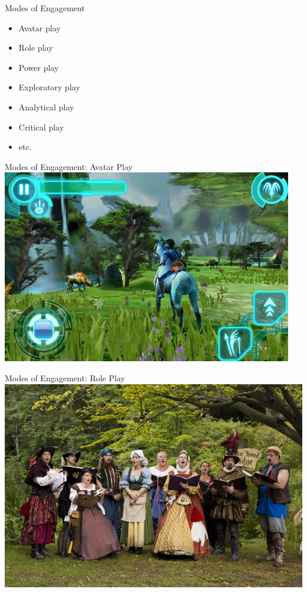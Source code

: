 \documentclass[xcolor=x11names]{beamer}
\begin{document}
\begin{frame}{Modes of Engagement}
  \begin{itemize}
    \item Avatar play
    \item Role play
    \item Power play
    \item Exploratory play
    \item Analytical play
    \item Critical play
    \item etc.
  \end{itemize}
\end{frame}

\begin{frame}{Modes of Engagement: Avatar Play}
  \includegraphics[width=\textwidth]{res/avatar-play.jpg}
\end{frame}

\begin{frame}{Modes of Engagement: Role Play}
  \includegraphics[width=\textwidth]{res/renfaire.jpg}
\end{frame}
\end{document}
